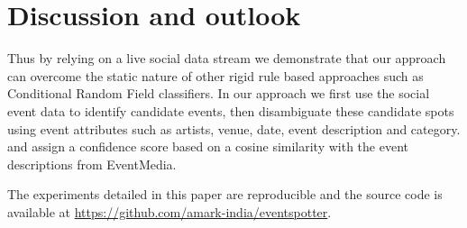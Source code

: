 \documentclass[10pt,a4paper]{article}
\begin{document}
\section{Discussion and outlook}
Thus by relying on a live social data stream we demonstrate that our approach can overcome the static nature of other rigid rule based approaches such as Conditional Random Field classifiers. In our approach we first use the social event data to identify candidate events, then disambiguate these candidate spots using event attributes such as artists, venue, date, event description and category. and assign a confidence score based on a cosine similarity with the event descriptions from EventMedia. 

{\color{red}{G:Outlook.}}

The experiments detailed in this paper are reproducible and the source code is available at \url{https://github.com/amark-india/eventspotter}. 




\end{document}
